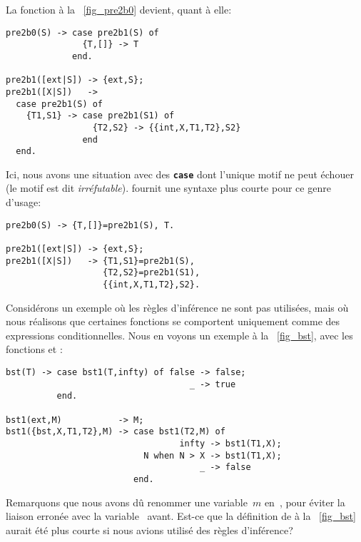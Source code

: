 La fonction à la \fig~\vref{fig_pre2b0} devient, quant à elle:
\begin{verbatim}
pre2b0(S) -> case pre2b1(S) of
               {T,[]} -> T
             end.

pre2b1([ext|S]) -> {ext,S};
pre2b1([X|S])   -> 
  case pre2b1(S) of
    {T1,S1} -> case pre2b1(S1) of
                 {T2,S2} -> {{int,X,T1,T2},S2}
               end
  end.
\end{verbatim}
Ici, nous avons une situation avec des \texttt{\textbf{case}} dont
l'unique motif ne peut échouer (le motif est dit
\emph{irréfutable}). \Erlang fournit une syntaxe plus courte pour ce
genre d'usage:
\begin{verbatim}
pre2b0(S) -> {T,[]}=pre2b1(S), T.

pre2b1([ext|S]) -> {ext,S};
pre2b1([X|S])   -> {T1,S1}=pre2b1(S),
                   {T2,S2}=pre2b1(S1),
                   {{int,X,T1,T2},S2}.
\end{verbatim}
Considérons un exemple où les règles d'inférence ne sont pas
utilisées, mais où nous réalisons que certaines fonctions se
comportent uniquement comme des expressions conditionnelles. Nous en
voyons un exemple à la \fig~\vref{fig_bst}, avec les fonctions
 et :
\begin{verbatim}
bst(T) -> case bst1(T,infty) of false -> false;
                                    _ -> true
          end.

bst1(ext,M)           -> M;
bst1({bst,X,T1,T2},M) -> case bst1(T2,M) of
                                  infty -> bst1(T1,X);
                           N when N > X -> bst1(T1,X);
                                      _ -> false
                         end.
\end{verbatim}
Remarquons que nous avons dû renommer une variable~\(m\)
en~, pour éviter la liaison erronée avec la
variable~ avant. Est-ce que la définition de  à
la \fig~\ref{fig_bst} aurait été plus courte si nous avions utilisé
des règles d'inférence?

